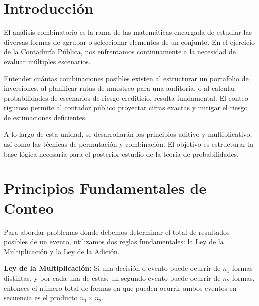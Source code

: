 \documentclass[12pt,letterpaper]{book}
\begin{document}
\newpage

\section{Introducción}
El análisis combinatorio es la rama de las matemáticas encargada de estudiar las diversas formas de agrupar o seleccionar elementos de un conjunto. En el ejercicio de la Contaduría Pública, nos enfrentamos continuamente a la necesidad de evaluar múltiples escenarios.

Entender cuántas combinaciones posibles existen al estructurar un portafolio de inversiones, al planificar rutas de muestreo para una auditoría, o al calcular probabilidades de escenarios de riesgo crediticio, resulta fundamental. El conteo riguroso permite al contador público proyectar cifras exactas y mitigar el riesgo de estimaciones deficientes.

A lo largo de esta unidad, se desarrollarán los principios aditivo y multiplicativo, así como las técnicas de permutación y combinación. El objetivo es estructurar la base lógica necesaria para el posterior estudio de la teoría de probabilidades.

\section{Principios Fundamentales de Conteo}

Para abordar problemas donde debemos determinar el total de resultados posibles de un evento, utilizamos dos reglas fundamentales: la Ley de la Multiplicación y la Ley de la Adición.

\begin{definicion}
    \textbf{Ley de la Multiplicación:} Si una decisión o evento puede ocurrir de $n_{1}$ formas distintas, y por cada una de estas, un segundo evento puede ocurrir de $n_{2}$ formas, entonces el número total de formas en que pueden ocurrir ambos eventos en secuencia es el producto $n_{1} \times n_{2}$.
\end{definicion}
\end{document}
